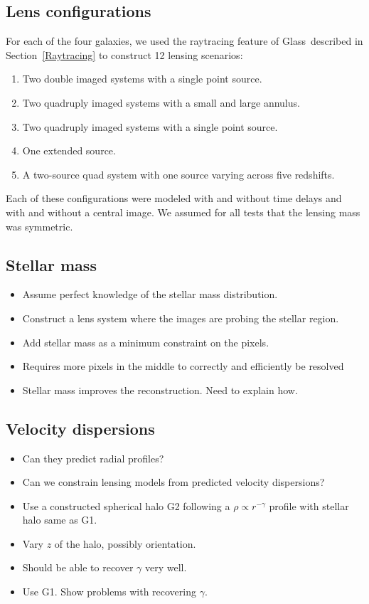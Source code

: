 \documentclass[onecolumn,galley]{mn2e}
\newcommand{\Glass}{{\sc Glass}}
\newcommand{\secref}[1] {Section~\ref{#1}}
\begin{document}
\subsection{Lens configurations} %

For each of the four galaxies, we used the raytracing feature of \Glass\
described in \secref{Raytracing} to construct 12 lensing scenarios:

\begin{enumerate}
\item Two double imaged systems with a single point source.
\item Two quadruply imaged systems with a small and large annulus.
\item Two quadruply imaged systems with a single point source.
\item One extended source. 
\item A two-source quad system with one source varying across five redshifts. 
\end{enumerate}

Each of these configurations were modeled with and without time delays and with
and without a central image. We assumed for all tests that the lensing mass was
symmetric.

\subsection{Stellar mass}
\begin{itemize}
\item Assume perfect knowledge of the stellar mass distribution.
\item Construct a lens system where the images are probing the stellar region.
\item Add stellar mass as a minimum constraint on the pixels.
\item Requires more pixels in the middle to correctly and efficiently be resolved
\item Stellar mass improves the reconstruction. Need to explain how.
\end{itemize}

\subsection{Velocity dispersions}

\begin{itemize}
\item Can they predict radial profiles?
\item Can we constrain lensing models from predicted velocity dispersions?
\item Use a constructed spherical halo G2 following a $\rho \propto r^{-\gamma}$ profile with stellar halo same as G1.
\item Vary $z$ of the halo, possibly orientation.
\item Should be able to recover $\gamma$ very well.
\item Use G1. Show problems with recovering $\gamma$.
\end{itemize}
\end{document}
